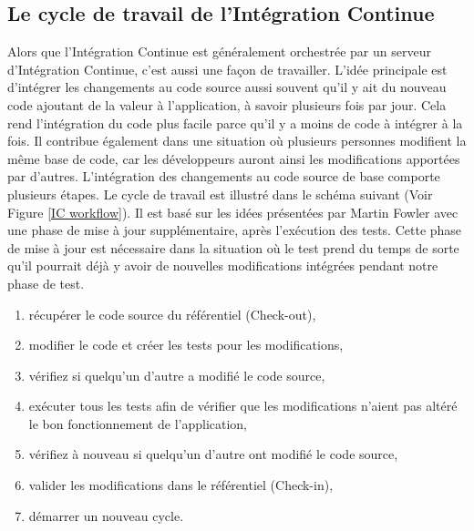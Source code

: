 \documentclass{report}
\begin{document}
      \subsection{Le cycle de travail de l’Intégration Continue}
      Alors que l’Intégration Continue est généralement orchestrée par un serveur d’Intégration Continue, c’est aussi une façon de travailler. L'idée principale est d'intégrer les changements au code source aussi souvent qu’il y ait du nouveau code ajoutant de la valeur à l’application, à savoir plusieurs fois par jour. Cela rend l'intégration du code plus facile parce qu'il y a moins de code à intégrer à la fois. Il contribue également dans une situation où plusieurs personnes modifient la même base de code, car les développeurs auront ainsi les modifications apportées par d'autres.
      L'intégration des changements au code source de base comporte plusieurs étapes. Le cycle de travail est illustré dans le schéma suivant (Voir Figure \ref{IC workflow}). Il est basé sur les idées présentées par Martin Fowler \cite{Fow00} avec une phase de mise à jour supplémentaire, après l'exécution des tests. Cette phase de mise à jour est nécessaire dans la situation où le test prend du temps de sorte qu'il pourrait déjà y avoir de nouvelles modifications intégrées pendant notre phase de test.\\

      \begin{enumerate}
        \item récupérer le code source du référentiel (Check-out),
        \item modifier le code et créer les tests pour les modifications,
        \item vérifiez si quelqu'un d'autre a modifié le code source,
        \item exécuter tous les tests afin de vérifier que les modifications n’aient pas altéré le bon fonctionnement de l’application,
        \item vérifiez à nouveau si quelqu'un d'autre ont modifié le code source,
        \item valider les modifications dans le référentiel (Check-in),
        \item démarrer un nouveau cycle.\\
      \end{enumerate}
\end{document}
